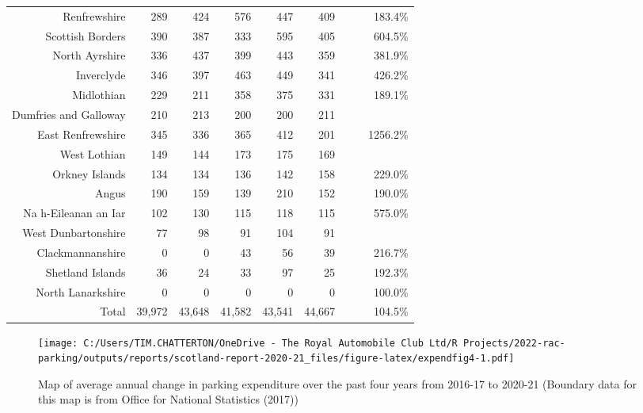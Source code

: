 \documentclass[
  12pt,
]{article}
\begin{document}
\begin{longtable}[t]{rrrrrrrrr}
Renfrewshire & 289 & 424 & 576 & 447 & 409 & \cellcolor{white}{ -8.5\%} & \cellcolor{white}{  9.1\%} & 183.4\%\\
Scottish Borders & 390 & 387 & 333 & 595 & 405 & \cellcolor{white}{-31.9\%} & \cellcolor{white}{  0.9\%} & 604.5\%\\
North Ayrshire & 336 & 437 & 399 & 443 & 359 & \cellcolor{white}{-19.0\%} & \cellcolor{white}{  1.7\%} & 381.9\%\\
Inverclyde & 346 & 397 & 463 & 449 & 341 & \cellcolor{white}{-24.1\%} & \cellcolor{white}{ -0.4\%} & 426.2\%\\
Midlothian & 229 & 211 & 358 & 375 & 331 & \cellcolor{white}{-11.7\%} & \cellcolor{white}{  9.6\%} & 189.1\%\\
Dumfries and Galloway & 210 & 213 & 200 & 200 & 211 & \cellcolor{white}{  5.5\%} & \cellcolor{white}{  0.1\%} & \\
East Renfrewshire & 345 & 336 & 365 & 412 & 201 & \cellcolor{white}{-51.2\%} & \cellcolor{white}{-12.6\%} & 1256.2\%\\
West Lothian & 149 & 144 & 173 & 175 & 169 & \cellcolor{white}{ -3.4\%} & \cellcolor{white}{  3.2\%} & \\
Orkney Islands & 134 & 134 & 136 & 142 & 158 & \cellcolor{white}{ 11.3\%} & \cellcolor{white}{  4.2\%} & 229.0\%\\
Angus & 190 & 159 & 139 & 210 & 152 & \cellcolor{white}{-27.6\%} & \cellcolor{white}{ -5.4\%} & 190.0\%\\
Na h-Eileanan an Iar & 102 & 130 & 115 & 118 & 115 & \cellcolor{white}{ -2.5\%} & \cellcolor{white}{  3.0\%} & 575.0\%\\
West Dunbartonshire & 77 & 98 & 91 & 104 & 91 & \cellcolor{white}{-12.5\%} & \cellcolor{white}{  4.3\%} & \\
Clackmannanshire & 0 & 0 & 43 & 56 & 39 & \cellcolor{white}{-30.4\%} & \cellcolor{white}{} & 216.7\%\\
Shetland Islands & 36 & 24 & 33 & 97 & 25 & \cellcolor{white}{-74.2\%} & \cellcolor{white}{ -8.7\%} & 192.3\%\\
North Lanarkshire & 0 & 0 & 0 & 0 & 0 & \cellcolor{white}{  0.0\%} & \cellcolor{white}{  0.0\%} & 100.0\%\\
\midrule
Total & 39,972 & 43,648 & 41,582 & 43,541 & 44,667 & \cellcolor{white}{  2.6\%} & \cellcolor{white}{  2.8\%} & 104.5\%\\*
\end{longtable}
\endgroup{}

\begin{figure}
\centering
\texttt{[image: C:/Users/TIM.CHATTERTON/OneDrive - The Royal Automobile Club Ltd/R Projects/2022-rac-parking/outputs/reports/scotland-report-2020-21\_files/figure-latex/expendfig4-1.pdf]}
\caption{\label{fig:expendfig4}Map of average annual change in parking expenditure over the past four years from 2016-17 to 2020-21 (Boundary data for this map is from Office for National Statistics (2017))}
\end{figure}
\end{document}
